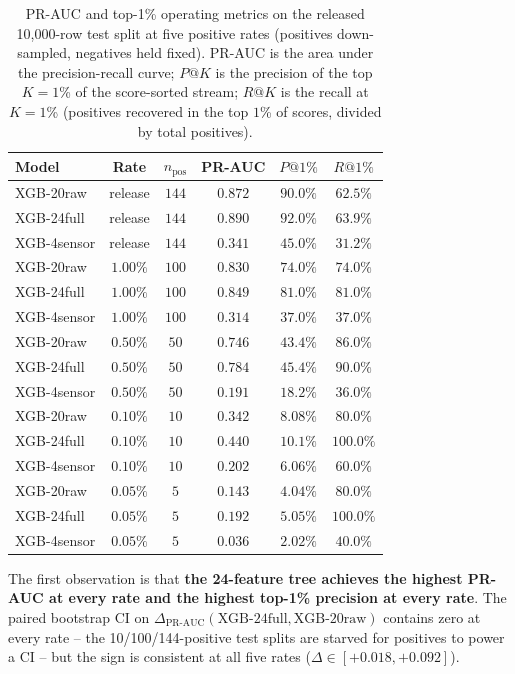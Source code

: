 \begin{table}[t]
\centering
\small
\caption{PR-AUC and top-1\% operating metrics on the released
10{,}000-row test split at five positive rates (positives
down-sampled, negatives held fixed). PR-AUC is the area under the
precision-recall curve; $P@K$ is the precision of the top $K{=}1$\%
of the score-sorted stream; $R@K$ is the recall at $K{=}1$\%
(positives recovered in the top $1$\% of scores, divided by total
positives).}
\label{tab:p8-evidence-pr-realistic}
\begin{tabular}{lccccc}
\toprule
Model & Rate & $n_{\text{pos}}$ & PR-AUC & $P@1\%$ & $R@1\%$ \\
\midrule
XGB-20raw   & release & $144$ & $0.872$ & $90.0\%$ & $62.5\%$ \\
XGB-24full  & release & $144$ & $0.890$ & $92.0\%$ & $63.9\%$ \\
XGB-4sensor & release & $144$ & $0.341$ & $45.0\%$ & $31.2\%$ \\
\midrule
XGB-20raw   & $1.00\%$ & $100$ & $0.830$ & $74.0\%$ & $74.0\%$ \\
XGB-24full  & $1.00\%$ & $100$ & $0.849$ & $81.0\%$ & $81.0\%$ \\
XGB-4sensor & $1.00\%$ & $100$ & $0.314$ & $37.0\%$ & $37.0\%$ \\
\midrule
XGB-20raw   & $0.50\%$ & $50$  & $0.746$ & $43.4\%$ & $86.0\%$ \\
XGB-24full  & $0.50\%$ & $50$  & $0.784$ & $45.4\%$ & $90.0\%$ \\
XGB-4sensor & $0.50\%$ & $50$  & $0.191$ & $18.2\%$ & $36.0\%$ \\
\midrule
XGB-20raw   & $0.10\%$ & $10$  & $0.342$ & $8.08\%$ & $80.0\%$ \\
XGB-24full  & $0.10\%$ & $10$  & $0.440$ & $10.1\%$ & $100.0\%$ \\
XGB-4sensor & $0.10\%$ & $10$  & $0.202$ & $6.06\%$ & $60.0\%$ \\
\midrule
XGB-20raw   & $0.05\%$ & $5$   & $0.143$ & $4.04\%$ & $80.0\%$ \\
XGB-24full  & $0.05\%$ & $5$   & $0.192$ & $5.05\%$ & $100.0\%$ \\
XGB-4sensor & $0.05\%$ & $5$   & $0.036$ & $2.02\%$ & $40.0\%$ \\
\bottomrule
\end{tabular}
\end{table}

The first observation is that \textbf{the 24-feature tree achieves the
highest PR-AUC at every rate and the highest top-1\% precision at every
rate}. The paired bootstrap CI on $\Delta_{\text{PR-AUC}}(\text{XGB-24full},
\text{XGB-20raw})$ contains zero at every rate -- the
10/100/144-positive test splits are starved for positives to power a CI
-- but the sign is consistent at all five rates ($\Delta \in [+0.018,
+0.092]$).

